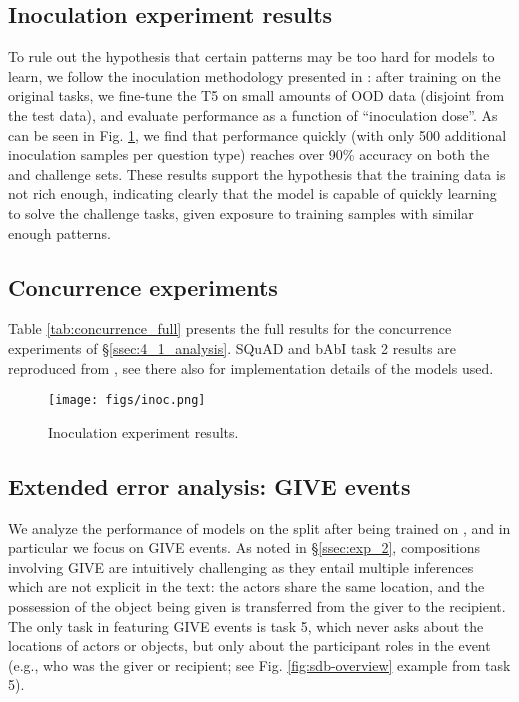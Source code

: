 \subsection{Inoculation experiment results}
\label{ssec:ext_inoc}
 To rule out the hypothesis that certain patterns may be too hard for models to learn, we follow the inoculation methodology presented in \citet{liu-etal-2019-inoculation}: after training on the original tasks, we fine-tune the T5 on small amounts of OOD data (disjoint from the test data), and evaluate performance as a function of ``inoculation dose''. As can be seen in Fig. \ref{fig:inoc}, we find that performance quickly (with only 500 additional inoculation samples per question type) reaches over 90\% accuracy on both the  and  challenge sets. These results support the hypothesis that the training data is not rich enough, indicating clearly that the model is capable of quickly learning to solve the challenge tasks, given exposure to training samples with similar enough patterns.
 

\subsection{Concurrence experiments}
\label{ssec:ext_concurrence}
Table \ref{tab:concurrence_full} presents the full results for the concurrence experiments of \S\ref{ssec:4_1_analysis}. SQuAD and bAbI task 2 results are reproduced from \citet{liu2021small}, see there also for implementation details of the models used.



\begin{figure}
\centering
\texttt{[image: figs/inoc.png]}

\caption{\label{fig:inoc} Inoculation experiment results.}
\end{figure}




\subsection{Extended error analysis: GIVE events}
\label{ssec:ext_err_analysis_give}
We analyze the performance of models on the  split after being trained on , and in particular we focus on GIVE events. As noted in \S\ref{ssec:exp_2}, compositions involving GIVE are intuitively challenging as they entail multiple inferences which are not explicit in the text: the actors share the same location, and the possession of the object being given is transferred from the giver to the recipient. The only task in  featuring GIVE events is task 5, which never asks about the locations of actors or objects, but only about the participant roles in the event (e.g., who was the giver or recipient; see Fig. \ref{fig:sdb-overview} example from task 5).

